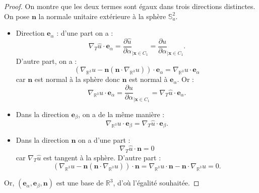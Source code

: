 \begin{proof}
On montre que les deux termes sont égaux dans trois directions distinctes. On pose $\mathbf{n}$ la normale unitaire extérieure à la sphère $\mathbb{S}_a^2$.
\begin{itemize}
\item Direction $\mathbf{e}_{\alpha}$ :
d'une part on a :
\begin{equation}
\nabla_T \hat{u} \cdot \mathbf{e}_{\alpha} = \dfrac{\partial \hat{u}}{\partial \alpha}_{| \mathbf{x} \in C_1}= \dfrac{\partial u}{\partial \alpha}_{| \mathbf{x} \in C_1}.
\end{equation}
D'autre part, on a :
\begin{equation}
\left( \nabla_{\mathbb{R}^3} u - \mathbf{n} \left( \mathbf{n} \cdot \nabla_{\mathbb{R}^3} u \right) \right) \cdot \mathbf{e}_{\alpha} = \nabla_{\mathbb{R}^3} u \cdot \mathbf{e}_{\alpha}
\end{equation}
car $\mathbf{n}$ est normal à la sphère donc $\mathbf{n}$ est normal à $\mathbf{e}_{\alpha}$.
Or :
\begin{equation}
\nabla_{\mathbb{R}^3} u \cdot \mathbf{e}_{\alpha} = \dfrac{\partial u}{\partial \alpha}_{| \mathbf{x} \in C_1} = \nabla_T \hat{u} \cdot \mathbf{e}_{\alpha}.
\end{equation}

\item Dans la direction $\mathbf{e}_{\beta}$, on a de la même manière :
\begin{equation}
\nabla_{\mathbb{R}^3} u \cdot \mathbf{e}_{\beta} = \nabla_T \hat{u} \cdot \mathbf{e}_{\beta}.
\end{equation}

\item Dans la direction $\mathbf{n}$ on a d'une part :
\begin{equation}
\nabla_T \hat{u} \cdot \mathbf{n} = 0 
\end{equation}
car $\nabla_T \hat{u}$ est tangent à la sphère. D'autre part :
\begin{equation}
\left( \nabla_{\mathbb{R}^3} u - \mathbf{n} \left( \mathbf{n} \cdot \nabla_{\mathbb{R}^3} u \right) \right) \cdot \mathbf{n} = \nabla_{\mathbb{R}^3} u \cdot \mathbf{n}- \mathbf{n} \cdot \nabla_{\mathbb{R}^3} u = 0.
\end{equation}
\end{itemize}
Or, $(\mathbf{e}_{\alpha}, \mathbf{e}_{\beta}, \mathbf{n})$ est une base de $\mathbb{R}^3$, d'où l'égalité souhaitée.
\end{proof}




















